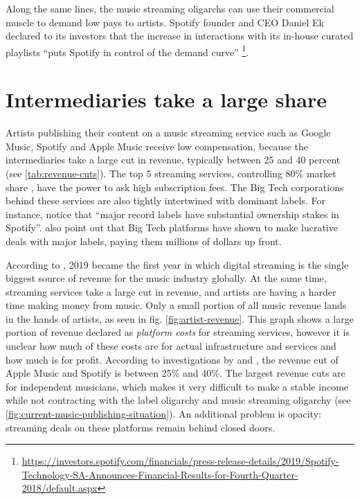Along the same lines, the music streaming oligarchs can use their commercial muscle to demand low pays to artists. Spotify founder and CEO Daniel Ek declared to its investors that the increase in interactions with its in-house curated playlists ``puts Spotify in control of the demand curve'' \footnote{\url{https://investors.spotify.com/financials/press-release-details/2019/Spotify-Technology-SA-Announces-Financial-Results-for-Fourth-Quarter-2018/default.aspx}}.

\section{Intermediaries take a large share}
Artists publishing their content on a music streaming service such as Google Music, Spotify and Apple Music receive low compensation, because the intermediaries take a large cut in revenue, typically between 25 and 40 percent (see \ref{tab:revenue-cuts}). The top 5 streaming services, controlling 80\% market share \citep{midiamarketshare2020}, have the power to ask high subscription fees. The Big Tech corporations behind these services are also tightly intertwined with dominant labels. For instance, \cite{aguiar2018platforms} notice that ``major record labels have substantial ownership stakes in Spotify''. \cite{meier2019rising} also point out that Big Tech platforms have shown to make lucrative deals with major labels, paying them millions of dollars up front.

According to \cite{ifpi2020global}, 2019 became the first year in which digital streaming is the single biggest source of revenue for the music industry globally. At the same time, streaming services take a large cut in revenue, and artists are having a harder time making money from music. Only a small portion of all music revenue lands in the hands of artists, as seen in fig. \ref{fig:artist-revenue}. This graph shows a large portion of revenue declared as \textit{platform costs} for streaming services, however it is unclear how much of these costs are for actual infrastructure and services and how much is for profit. According to investigations by \cite{chris2018dissecting} and \cite{recode2015}, the revenue cut of Apple Music and Spotify is between 25\% and 40\%. The largest revenue cuts are for independent musicians, which makes it very difficult to make a stable income while not contracting with the label oligarchy and music streaming oligarchy (see \ref{fig:current-music-publishing-situation}). An additional problem is opacity: streaming deals on these platforms remain behind closed doors. 

